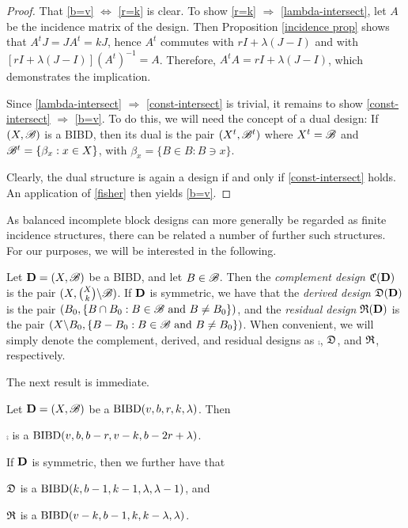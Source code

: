 \documentclass[../../../main]{subfiles}
\begin{document}
\begin{proof}
 That \ref{b=v} $\Leftrightarrow$ \ref{r=k} is clear. To show \ref{r=k} $\Rightarrow$ \ref{lambda-intersect}, let $A$ be the incidence matrix of the design. Then Proposition \ref{incidence prop} shows that $A^tJ = JA^t = kJ$, hence $A^t$ commutes with $rI + \lambda(J-I)$ and with $[rI + \lambda(J-I)](A^t)^{-1} = A$. Therefore, $A^tA = rI + \lambda(J-I)$, which demonstrates the implication.
 
 Since \ref{lambda-intersect} $\Rightarrow$ \ref{const-intersect} is trivial, it remains to show \ref{const-intersect} $\Rightarrow$ \ref{b=v}. To do this, we will need the concept of a dual design: If $(X,\mathscr{B})$ is a BIBD, then its dual is the pair $(X^t,\mathscr{B}^t)$ where $X^t = \mathscr{B}$ and $\mathscr{B}^t = \{\beta_x : x \in X\}$, with $\beta_x = \{B \in B : B \ni x\}$.
 
 Clearly, the dual structure is again a design if and only if \ref{const-intersect} holds. An application of \ref{fisher} then yields \ref{b=v}.
\end{proof}

As balanced incomplete block designs can more generally be regarded as finite incidence structures, there can be related a number of further such structures. For our purposes, we will be interested in the following. 

\begin{defin}\label{res-der}
 Let $\mathbf{D}=(X,\mathscr{B})$ be a BIBD, and let $B \in \mathscr{B}$. Then the {\it complement design} $\mathfrak{C}(\mathbf{D})$ is the pair $(X,\binom{X}{k} \backslash \mathscr{B})$. If $\mathbf{D}$ is symmetric, we have that the {\it derived design} $\mathfrak{D}(\mathbf{D})$ is the pair $(B_0, \{B \cap B_0 : B \in \mathscr{B} \text{ and } B \neq B_0\})$, and the {\it residual design} $\mathfrak{R}(\mathbf{D})$ is the pair $(X \backslash B_0, \{B - B_0 : B \in \mathscr{B} \text{ and } B \neq B_0\})$. When convenient, we will simply denote the complement, derived, and residual designs as $\comp$, $\mathfrak{D}$, and $\mathfrak{R}$, respectively.
\end{defin}

The next result is immediate.

\begin{prop}\label{res-der-params}
 Let $\mathbf{D}=(X,\mathscr{B})$ be a $\text{BIBD}(v,b,r,k,\lambda)$. Then
 \begin{defenum}
  \item\label{comp-parameters} $\comp$ is a $\text{BIBD}(v,b,b-r,v-k,b-2r+\lambda)$.
 \end{defenum}
 If $\mathbf{D}$ is symmetric, then we further have that
 \begin{defenum}[resume]
  \item\label{der-parameters} $\mathfrak{D}$ is a $\text{BIBD}(k,b-1,k-1,\lambda,\lambda-1)$, and 
  \item\label{res-parameters} $\mathfrak{R}$ is a $\text{BIBD}(v-k,b-1,k,k-\lambda,\lambda)$.
 \end{defenum}
\end{prop}
\end{document}
